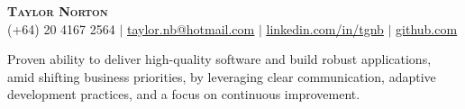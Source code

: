\documentclass[letterpaper,11pt]{article}
\begin{document}

\begin{center}
    \textbf{\Huge \scshape Taylor Norton} \\ \vspace{1pt}
    \small (+64) 20 4167 2564 $|$ \href{mailto:taylor.nb@hotmail.com}{\underline{taylor.nb@hotmail.com}} $|$ 
    \href{https://linkedin.com/in/tgnb}{\underline{linkedin.com/in/tgnb}} $|$
    \href{https://github.com/lil-snorts}{\underline{github.com}}
\end{center}
Proven ability to deliver high-quality software and build robust applications, amid shifting business priorities, by leveraging clear communication, adaptive development practices, and a focus on continuous improvement.


\end{document}
